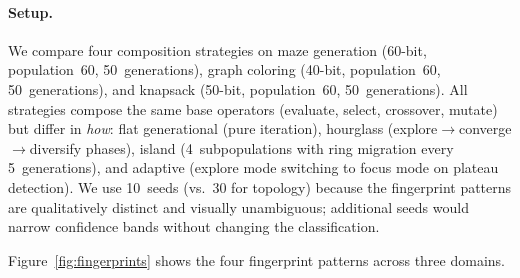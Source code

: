 \documentclass[dvipsnames,format=sigconf,anonymous=false,review=false]{acmart}
\begin{document}
\paragraph{Setup.}
\label{sec:fingerprint-setup}
We compare four composition strategies on maze generation (60-bit, population~60, 50~generations), graph coloring (40-bit, population~60, 50~generations), and knapsack (50-bit, population~60, 50~generations). All strategies compose the same base operators (evaluate, select, crossover, mutate) but differ in \emph{how}: flat generational (pure iteration), hourglass (explore$\to$converge$\to$diversify phases), island (4~subpopulations with ring migration every 5~generations), and adaptive (explore mode switching to focus mode on plateau detection). We use 10~seeds (vs.\ 30 for topology) because the fingerprint patterns are qualitatively distinct and visually unambiguous; additional seeds would narrow confidence bands without changing the classification.

Figure~\ref{fig:fingerprints} shows the four fingerprint patterns across three domains.
\end{document}

